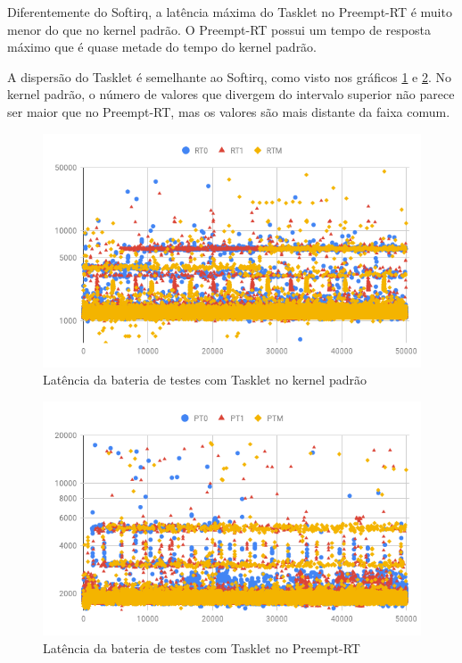 Diferentemente do Softirq, a latência máxima do Tasklet no Preempt-RT é muito menor do que no kernel padrão. O Preempt-RT possui um tempo de resposta máximo que é quase metade do tempo do kernel padrão.

A dispersão do Tasklet é semelhante ao Softirq, como visto nos gráficos \ref{grafico:r-tasklet} e \ref{grafico:p-tasklet}. No kernel padrão, o número de valores que divergem do intervalo superior não parece ser maior que no Preempt-RT, mas os valores são mais distante da faixa comum.

\begin{figure}[!p]
    \centering
    \includegraphics[width=\textwidth]{graficos/rt-scatter.png}
    \caption{Latência da bateria de testes com Tasklet no kernel padrão}
    \label{grafico:r-tasklet}
\end{figure}

\begin{figure}[!p]
    \centering
    \includegraphics[width=\textwidth]{graficos/pt-scatter.png}
    \caption{Latência da bateria de testes com Tasklet no Preempt-RT}
    \label{grafico:p-tasklet}
\end{figure}

